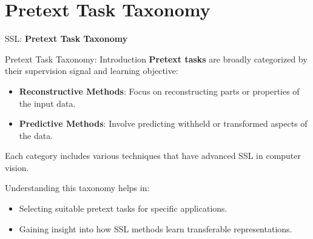 \section{Pretext Task Taxonomy}
\begin{frame}{}
    \LARGE SSL: \textbf{Pretext Task Taxonomy}
\end{frame}

\begin{frame}[allowframebreaks]{Pretext Task Taxonomy: Introduction}
    \textbf{Pretext tasks} are broadly categorized by their supervision signal and learning objective: 
    \begin{itemize}
        \item \textbf{Reconstructive Methods}: Focus on reconstructing parts or properties of the input data.
        \item \textbf{Predictive Methods}: Involve predicting withheld or transformed aspects of the data.
    \end{itemize}
    
    Each category includes various techniques that have advanced SSL in computer vision.
    
    Understanding this taxonomy helps in:
    \begin{itemize}
        \item Selecting suitable pretext tasks for specific applications.
        \item Gaining insight into how SSL methods learn transferable representations.
    \end{itemize}
\end{frame}
